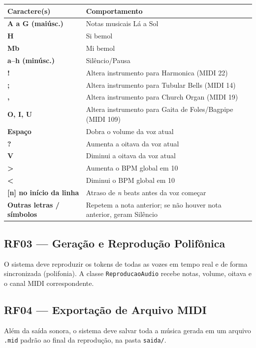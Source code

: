 \documentclass[12pt, a4paper]{article}
\begin{document}
\begin{center}
\begin{tabular}{>{\bfseries}p{3.5cm} p{9cm}}
  \toprule
  Caractere(s) & Comportamento \\
  \midrule
  A a G (maiúsc.) & Notas musicais Lá a Sol \\
  H & Si bemol \\
  Mb & Mi bemol \\
  a--h (minúsc.) & Silêncio/Pausa \\
  ! & Altera instrumento para Harmonica (MIDI 22) \\
  ; & Altera instrumento para Tubular Bells (MIDI 14) \\
  , & Altera instrumento para Church Organ (MIDI 19) \\
  O, I, U & Altera instrumento para Gaita de Foles/Bagpipe (MIDI 109) \\
  Espaço & Dobra o volume da voz atual \\
  ? & Aumenta a oitava da voz atual \\
  V & Diminui a oitava da voz atual \\
  {>} & Aumenta o BPM global em 10 \\
  {<} & Diminui o BPM global em 10 \\
  {[}n{]} no início da linha & Atraso de \textit{n} beats antes da voz começar \\
  Outras letras / símbolos & Repetem a nota anterior; se não houver nota anterior, geram Silêncio \\
  \bottomrule
\end{tabular}
\end{center}

\subsection{RF03 — Geração e Reprodução Polifônica}

O sistema deve reproduzir os tokens de todas as vozes em tempo real e de forma sincronizada (polifonia). A classe \texttt{ReproducaoAudio} recebe notas, volume, oitava e o canal MIDI correspondente.

\subsection{RF04 — Exportação de Arquivo MIDI}

Além da saída sonora, o sistema deve salvar toda a música gerada em um arquivo \texttt{.mid} padrão ao final da reprodução, na pasta \texttt{saida/}.
\end{document}
